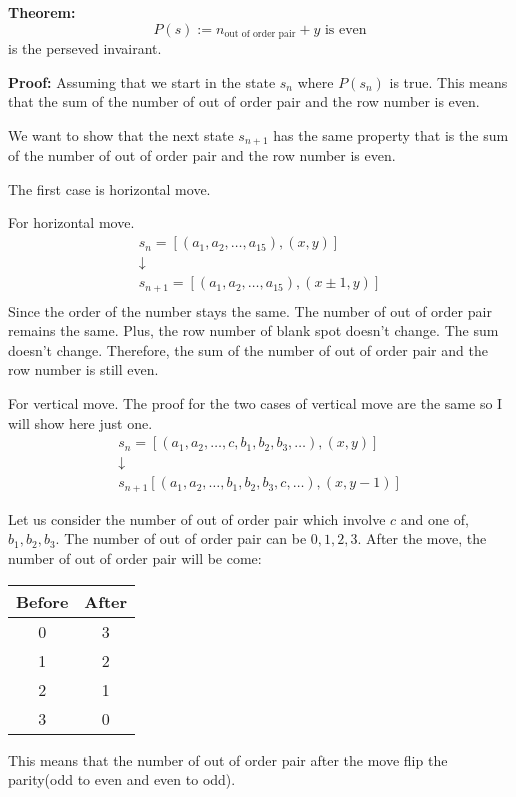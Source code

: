 \documentclass[a4paper, 12pt]{article}
\newcommand{\theorem}{\vspace{1em}\noindent\textbf{Theorem:} }
\renewcommand{\proof}{\vspace{0.5em}\noindent\textbf{Proof:} }
\theoremstyle{examplestyle}
\begin{document}
\begin{multicols}{2}
\begin{enumerate}
	\theorem
		\[
		P(s) := n_\text{out of order pair} + y \text{ is even}
		\]
		is the perseved invairant.
		
	\proof
	Assuming that we start in the state $s_n$ where $P(s_n)$ is true. This means that the sum of the number of out of order pair and the row number is even.
	
	We want to show that the next state $s_{n+1}$ has the same property that is the sum of the number of out of order pair and the row number is even.
	
	The first case is horizontal move.
	
	For horizontal move.
	\begin{gather*}
	s_n = [ (a_1, a_2, \ldots, a_{15}), (x,y) ]\\
	\downarrow\\
	s_{n+1} = [ (a_1, a_2, \ldots, a_{15}), (x \pm 1,y) ]	\\
	\end{gather*}
	Since the order of the number stays the same. The number of out of order pair remains the same. Plus, the row number of blank spot doesn't change. The sum doesn't change. Therefore, the sum of the number of out of order pair and the row number is still even.
	
	For vertical move. The proof for the two cases of vertical move are the same so I will show here just one.
	\begin{gather*}
	s_n = [(a_1, a_2, \ldots, c, b_1, b_2, b_3,\ldots ), (x,y)]\\
	\downarrow\\
	s_{n+1}[(a_1, a_2, \ldots, b_1, b_2, b_3,c, \ldots ), (x,y-1)]
	\end{gather*}
	
	Let us consider the number of out of order pair which involve $c$ and one of, $b_1, b_2, b_3$. The number of out of order pair can be $0, 1, 2, 3$. After the move, the number of out of order pair will be come:
\begin{center}
		\begin{tabular}{|c|c|}
		\hline Before & After \\ 
		\hline  0 & 3 \\ 
		\hline  1 & 2 \\ 
		\hline  2 & 1 \\ 
		\hline  3 & 0 \\ 
		\hline 
	\end{tabular}
\end{center}
	
	This means that the number of out of order pair after the move flip the parity(odd to even and even to odd).
	

\end{enumerate}
\end{multicols}
\end{document}
